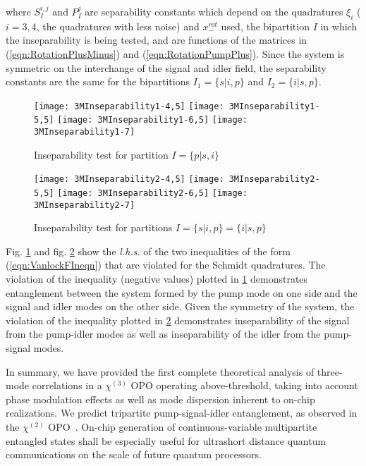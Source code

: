 \documentclass[aps,prl,twocolumn,groupedaddress]{revtex4-1}
\begin{document}
where $S_{I}^{i,j}$ and $P_{I}^{j}$ are separability constants which depend on the quadratures $\xi_i$ ($i=3,4$, the quadratures with less noise) and $x_-^{rot}$ used, the bipartition $I$ in which the inseparability is being tested, and are functions of the matrices in (\ref{eqn:RotationPlusMinus}) and (\ref{eqn:RotationPumpPlus}). Since the system is symmetric on the interchange of the signal and idler field, the separability constants are the same for the bipartitions $I_1=\{s|i,p\}$  and $I_2=\{i|s,p\}$.
\begin{figure}[h]
	\begin{center}
		\texttt{[image: 3MInseparability1-4,5]}
		\texttt{[image: 3MInseparability1-5,5]}
		\texttt{[image: 3MInseparability1-6,5]}
		\texttt{[image: 3MInseparability1-7]}
		\caption{Inseparability test for partition $I=\{p|s,i\}$}
		\label{fig:3MInseparability1}
	\end{center}
\end{figure}
\begin{figure}[h]
	\begin{center}
		\texttt{[image: 3MInseparability2-4,5]}
		\texttt{[image: 3MInseparability2-5,5]}
		\texttt{[image: 3MInseparability2-6,5]}
		\texttt{[image: 3MInseparability2-7]}
		\caption{Inseparability test for partitions $I=\{s|i,p\}=\{i|s,p\}$}
		\label{fig:3MInseparability2}
	\end{center}
\end{figure}

Fig. \ref{fig:3MInseparability1} and fig. \ref{fig:3MInseparability2} show the \textit{l.h.s.} of the two inequalities of the form (\ref{eqn:VanlockFIneqn}) that are violated for the Schmidt quadratures. The violation of the inequality (negative values) plotted in \ref{fig:3MInseparability1} demonstrates entanglement between the system formed by the pump mode on one side and the signal and idler modes on the other side.  Given the symmetry of the system, the violation of the inequality plotted in \ref{fig:3MInseparability2} demonstrates inseparability of the signal from the pump-idler modes as well as inseparability of the idler from the pump-signal modes.

In summary, we have provided the first complete theoretical analysis of three-mode correlations in a $\chi^{(3)}$ OPO operating above-threshold, taking into account phase modulation effects as well as mode dispersion inherent to on-chip realizations. We predict tripartite pump-signal-idler entanglement, as observed in the $\chi^{(2)}$ OPO~\cite{Coelho2009}. On-chip generation of continuous-variable multipartite entangled states shall be especially useful for ultrashort distance quantum communications on the scale of future quantum processors.
\end{document}
